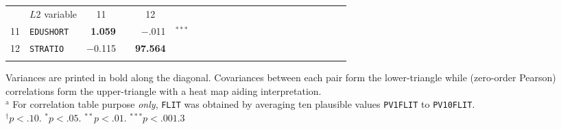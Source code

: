 {\begin{tabular}{cl r@{\hskip -0.1mm}l r@{\hskip -0.1mm}l r@{\hskip -0.1mm}l r@{\hskip -0.1mm}l r@{\hskip -0.1mm}l r@{\hskip -0.1mm}l r@{\hskip -0.1mm}l r@{\hskip -0.1mm}l r@{\hskip -0.1mm}l r@{\hskip -0.1mm}l}
      \cmidrule[0.08em]{1-6}          & $L2$ variable & \multicolumn{1}{c}{11} &       & \multicolumn{1}{c}{12} &       &       &       &       &       &       &       &       &       &       &       &       &       &       &       &       &  \\
      \cmidrule{1-6}    11    & \texttt{EDUSHORT} & \textbf{1.059} &       & \cellcolor[rgb]{ 1,  .988,  .988}$-$.011 & $^{***}$ &       &       &       &       &       &       &       &       &       &       &       &       &       &       &       &  \\
            12    & \texttt{STRATIO} & $-$0.115 &       & \textbf{97.564} &       &       &       &       &       &       &       &       &       &       &       &       &       &       &       &       &  \\
      \cmidrule[0.08em]{1-6}
      &       &       &       &       &       &       &       &       &       &       &       &       &       &       &       &       &       &       &       &       &  \\
      \end{tabular}
}{Variances are printed in bold along the diagonal. Covariances between each pair form the lower-triangle while (zero-order Pearson) correlations form the upper-triangle with a heat map aiding interpretation.\\
$^\text{a}$ For correlation table purpose \emph{only}, \texttt{FLIT} was obtained by averaging ten plausible values \texttt{PV1FLIT} to \texttt{PV10FLIT}.\\
$^\dagger p < .10$. $^* p < .05$. $^{**} p < .01$. $^{***} p < .001$.}{3}
